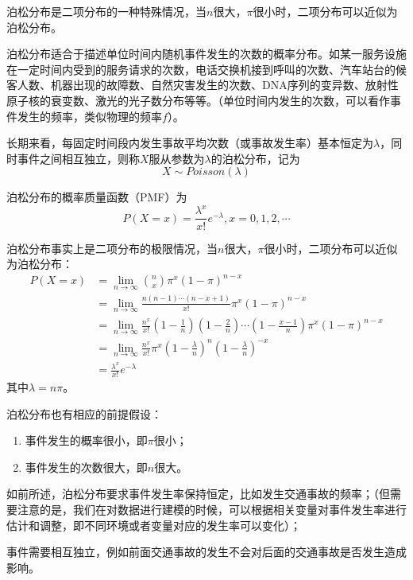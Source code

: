 泊松分布是二项分布的一种特殊情况，当$n$很大，$\pi$很小时，二项分布可以近似为泊松分布。

\begin{example}
    泊松分布适合于描述单位时间内随机事件发生的次数的概率分布。如某一服务设施在一定时间内受到的服务请求的次数，电话交换机接到呼叫的次数、汽车站台的候客人数、机器出现的故障数、自然灾害发生的次数、DNA序列的变异数、放射性原子核的衰变数、激光的光子数分布等等。（单位时间内发生的次数，可以看作事件发生的频率，类似物理的频率$f$）。
\end{example}

长期来看，每固定时间段内发生事故平均次数（或事故发生率）基本恒定为$\lambda$，同时事件之间相互独立，则称$X$服从参数为$\lambda$的泊松分布，记为
\begin{equation}
    X \sim Poisson(\lambda)
\end{equation}

泊松分布的概率质量函数（PMF）为
\begin{equation}
    P(X = x) = \frac{\lambda^x}{x!}e^{-\lambda}, x = 0,1,2,\cdots
\end{equation}

泊松分布事实上是二项分布的极限情况，当$n$很大，$\pi$很小时，二项分布可以近似为泊松分布：
\begin{equation}
    \begin{aligned}
        P(X = x) & = \lim_{n \to \infty} \binom{n}{x}\pi^x(1-\pi)^{n-x}                                                                                         \\
                 & = \lim_{n \to \infty} \frac{n(n-1)\cdots(n-x+1)}{x!}\pi^x(1-\pi)^{n-x}                                                                       \\
                 & = \lim_{n \to \infty} \frac{n^x}{x!}\left(1-\frac{1}{n}\right)\left(1-\frac{2}{n}\right)\cdots\left(1-\frac{x-1}{n}\right)\pi^x(1-\pi)^{n-x} \\
                 & = \lim_{n \to \infty} \frac{n^x}{x!}\pi^x\left(1-\frac{\lambda}{n}\right)^n\left(1-\frac{\lambda}{n}\right)^{-x}                             \\
                 & = \frac{\lambda^x}{x!}e^{-\lambda}
    \end{aligned}
\end{equation}
其中$\lambda = n\pi$。

\begin{note}
    泊松分布也有相应的前提假设：
    \begin{enumerate}[itemsep=0pt,parsep=0pt]
        \item 事件发生的概率很小，即$\pi$很小；
        \item 事件发生的次数很大，即$n$很大。
    \end{enumerate}


    如前所述，泊松分布要求事件发生率保持恒定，比如发生交通事故的频率；（但需要注意的是，我们在对数据进行建模的时候，可以根据相关变量对事件发生率进行估计和调整，即不同环境或者变量对应的发生率可以变化）；

    事件需要相互独立，例如前面交通事故的发生不会对后面的交通事故是否发生造成影响。
\end{note}

